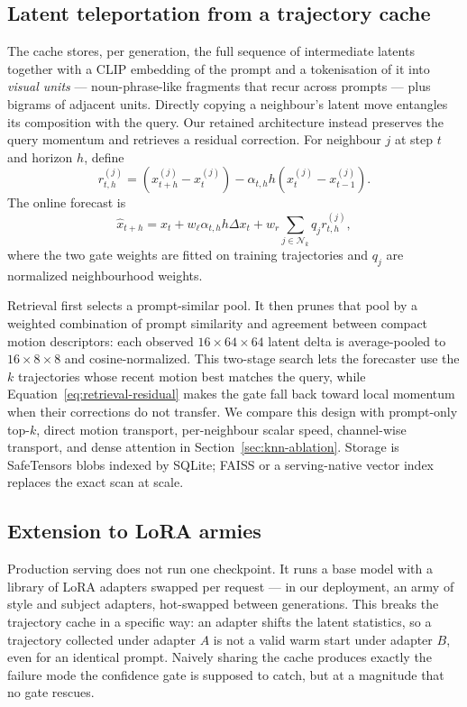 \documentclass[11pt,a4paper]{article}
\begin{document}
\subsection{Latent teleportation from a trajectory cache}
\label{sec:retrieval-method}

The cache stores, per generation, the full sequence of intermediate latents
together with a CLIP \citep{radford2021clip} embedding of the prompt and a
tokenisation of it into \emph{visual units} --- noun-phrase-like fragments that
recur across prompts --- plus bigrams of adjacent units. Directly copying a
neighbour's latent move entangles its composition with the query. Our retained
architecture instead preserves the query momentum and retrieves a residual
correction. For neighbour $j$ at step $t$ and horizon $h$, define
\begin{equation}
 r^{(j)}_{t,h} =
 (x^{(j)}_{t+h}-x^{(j)}_t)
 - \alpha_{t,h}h(x^{(j)}_t-x^{(j)}_{t-1}).
\end{equation}
The online forecast is
\begin{equation}
 \hat{x}_{t+h}=x_t+w_\ell\alpha_{t,h}h\Delta x_t
 +w_r\sum_{j\in\mathcal{N}_k}q_j r^{(j)}_{t,h},
 \label{eq:retrieval-residual}
\end{equation}
where the two gate weights are fitted on training trajectories and $q_j$ are
normalized neighbourhood weights.

Retrieval first selects a prompt-similar pool. It then prunes that pool by a
weighted combination of prompt similarity and agreement between compact motion
descriptors: each observed $16\times64\times64$ latent delta is average-pooled
to $16\times8\times8$ and cosine-normalized. This two-stage search lets the
forecaster use the $k$ trajectories whose recent motion best matches the query,
while Equation~\ref{eq:retrieval-residual} makes the gate fall back toward local
momentum when their corrections do not transfer. We compare this design with
prompt-only top-$k$, direct motion transport, per-neighbour scalar speed,
channel-wise transport, and dense attention in
Section~\ref{sec:knn-ablation}. Storage is SafeTensors blobs indexed by SQLite;
FAISS \citep{johnson2019faiss} or a serving-native vector index replaces the
exact scan at scale.

\subsection{Extension to LoRA armies}
\label{sec:lora}

Production serving does not run one checkpoint. It runs a base model with a
library of LoRA adapters \citep{hu2022lora} swapped per request --- in our
deployment, an army of style and subject adapters, hot-swapped between
generations. This breaks the trajectory cache in a specific way: an adapter
shifts the latent statistics, so a trajectory collected under adapter $A$ is not
a valid warm start under adapter $B$, even for an identical prompt. Naively
sharing the cache produces exactly the failure mode the confidence gate is
supposed to catch, but at a magnitude that no gate rescues.
\end{document}
